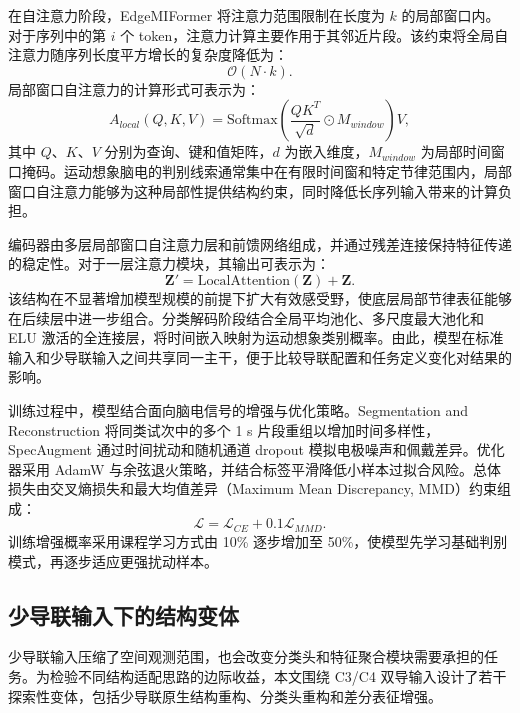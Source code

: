 在自注意力阶段，EdgeMIFormer 将注意力范围限制在长度为 $k$ 的局部窗口内。对于序列中的第 $i$ 个 token，注意力计算主要作用于其邻近片段。该约束将全局自注意力随序列长度平方增长的复杂度降低为：
\begin{equation}
    \mathcal{O}(N \cdot k).
    \label{eq:complexity}
\end{equation}
局部窗口自注意力的计算形式可表示为：
\begin{equation}
    A_{local}(Q,K,V)=\text{Softmax}\left(\frac{QK^{T}}{\sqrt{d}}\odot M_{window}\right)V,
    \label{eq:local_attention}
\end{equation}
其中 $Q$、$K$、$V$ 分别为查询、键和值矩阵，$d$ 为嵌入维度，$M_{window}$ 为局部时间窗口掩码。运动想象脑电的判别线索通常集中在有限时间窗和特定节律范围内，局部窗口自注意力能够为这种局部性提供结构约束，同时降低长序列输入带来的计算负担。

编码器由多层局部窗口自注意力层和前馈网络组成，并通过残差连接保持特征传递的稳定性。对于一层注意力模块，其输出可表示为：
\begin{equation}
    \mathbf{Z}' = \text{LocalAttention}(\mathbf{Z}) + \mathbf{Z}.
    \label{eq:residual}
\end{equation}
该结构在不显著增加模型规模的前提下扩大有效感受野，使底层局部节律表征能够在后续层中进一步组合。分类解码阶段结合全局平均池化、多尺度最大池化和 ELU 激活的全连接层，将时间嵌入映射为运动想象类别概率。由此，模型在标准输入和少导联输入之间共享同一主干，便于比较导联配置和任务定义变化对结果的影响。

训练过程中，模型结合面向脑电信号的增强与优化策略。Segmentation and Reconstruction 将同类试次中的多个 1 s 片段重组以增加时间多样性，SpecAugment 通过时间扰动和随机通道 dropout 模拟电极噪声和佩戴差异。优化器采用 AdamW 与余弦退火策略，并结合标签平滑降低小样本过拟合风险。总体损失由交叉熵损失和最大均值差异（Maximum Mean Discrepancy, MMD）约束组成：
\begin{equation}
    \mathcal{L}=\mathcal{L}_{CE}+0.1\mathcal{L}_{MMD}.
    \label{eq:edgemiformer_training_loss}
\end{equation}
训练增强概率采用课程学习方式由 10\% 逐步增加至 50\%，使模型先学习基础判别模式，再逐步适应更强扰动样本。

\subsection{少导联输入下的结构变体}
少导联输入压缩了空间观测范围，也会改变分类头和特征聚合模块需要承担的任务。为检验不同结构适配思路的边际收益，本文围绕 C3/C4 双导输入设计了若干探索性变体，包括少导联原生结构重构、分类头重构和差分表征增强。

